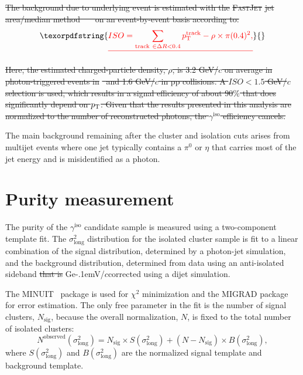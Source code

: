\documentclass[ALICE,manyauthors]{cernphprep}
\newcommand{\lambdasquare}{\ensuremath{\sigma^{2}_{\mathrm{long}}}}
\newcommand{\gammaiso}{\ensuremath{\gamma^\mathrm{iso}}}
\newcommand{\pPb}          {\mbox{p--Pb}\xspace}
\newcommand{\pt}           {\ensuremath{p_{\rm T}}\xspace}
\newcommand{\GeVc}         {Ge\kern-.1emV/$c$\xspace}
\providecommand{\DIFaddtex}[1]{{\protect\color{blue}\uwave{#1}}} %
\providecommand{\DIFdeltex}[1]{{\protect\color{red}\sout{#1}}}                      %
\providecommand{\DIFaddbegin}{} %
\providecommand{\DIFaddend}{} %
\providecommand{\DIFdelbegin}{} %
\providecommand{\DIFdelend}{} %
\providecommand{\DIFadd}[1]{\texorpdfstring{\DIFaddtex{#1}}{#1}} %
\providecommand{\DIFdel}[1]{\texorpdfstring{\DIFdeltex{#1}}{}} %
\newcommand{\DIFscaledelfig}{0.5}
\newlength{\DIFdelgraphicswidth} %
\newlength{\DIFdelgraphicsheight} %
\newcommand{\DIFaddincludegraphics}[2][]{{\color{blue}\fbox{\DIFOincludegraphics[#1]{#2}}}} %
\newcommand{\DIFdelincludegraphics}[2][]{%
\sbox{\DIFdelgraphicsbox}{\DIFOincludegraphics[#1]{#2}}%
\settoboxwidth{\DIFdelgraphicswidth}{\DIFdelgraphicsbox} %
\settoboxtotalheight{\DIFdelgraphicsheight}{\DIFdelgraphicsbox} %
\scalebox{\DIFscaledelfig}{%
\parbox[b]{\DIFdelgraphicswidth}{\usebox{\DIFdelgraphicsbox}\\[-\baselineskip] \rule{\DIFdelgraphicswidth}{0em}}\llap{\resizebox{\DIFdelgraphicswidth}{\DIFdelgraphicsheight}{%
\setlength{\unitlength}{\DIFdelgraphicswidth}%
\begin{picture}(1,1)%
\thicklines\linethickness{2pt} %
{\color[rgb]{1,0,0}\put(0,0){\framebox(1,1){}}}%
{\color[rgb]{1,0,0}\put(0,0){\line( 1,1){1}}}%
{\color[rgb]{1,0,0}\put(0,1){\line(1,-1){1}}}%
\end{picture}%
}\hspace*{3pt}}} %
} %
\DeclareRobustCommand{\DIFaddbegin}{\DIFOaddbegin \let\includegraphics\DIFaddincludegraphics} %
\DeclareRobustCommand{\DIFaddend}{\DIFOaddend \let\includegraphics\DIFOincludegraphics} %
\DeclareRobustCommand{\DIFdelbegin}{\DIFOdelbegin \let\includegraphics\DIFdelincludegraphics} %
\DeclareRobustCommand{\DIFdelend}{\DIFOaddend \let\includegraphics\DIFOincludegraphics} %
\begin{document}
\DIFdel{The background due to underlying event is estimated with the }\textsc{\DIFdel{FastJet}} %
\DIFdel{jet area/median method~\mbox{%
\cite{Cacciari:2009dp} }%
on an event-by-event basis according to:
}\begin{displaymath}
\DIFdel{ISO = \sum_{\mathrm{track}~\in\Delta R<0.4} p_{\mathrm{T}}^{\mathrm{track}} - \rho \times \pi(0.4)^{2},
}\end{displaymath}

\DIFdel{Here, the estimated charged-particle density, $\rho$, is 3.2 GeV/$c$ on average in photon-triggered events in }%
\DIFdel{~and 1.6 GeV/$c$ in pp collisions. A $ISO<1.5$ GeV/$c$ selection is used, which results in a signal efficiency of about 90$\%$ that does significantly depend on $\pt$. Given that the results presented in this analysis are normalized to the number of reconstructed photons, the $\gammaiso$ efficiency cancels. 
}%

\DIFdelend The main background 
remaining after the cluster and isolation cuts arises from multijet events where one jet typically contains a $\pi^{0}$ or $\eta$ that carries most of the jet energy and is misidentified as a photon.

\section{Purity measurement}
\label{sec:purity}
The purity of the $\gammaiso$ candidate sample is measured using a two-component template fit. The $\lambdasquare$ distribution for the isolated cluster sample is fit to a linear combination of the signal distribution, determined by a photon-jet simulation, and the background distribution, determined from data using an anti-isolated sideband \DIFdelbegin \DIFdel{that is }\DIFdelend \DIFaddbegin \DIFadd{($5.0 < ISO < 10.0$ }\GeVc\DIFadd{) and }\DIFaddend corrected using a dijet simulation.

The \textsc{MINUIT}~\cite{James:1975dr} package is used for $\chi^{2}$ minimization and the \textsc{MIGRAD} package for error estimation. The only free parameter in the fit is the number of signal clusters, $N_{\mathrm{sig}}$, because the overall normalization, $N$, is fixed to the total number of isolated clusters:
\begin{equation}
N^{\mathrm{observed}}(\lambdasquare) = N_{\mathrm{sig}}\times S(\lambdasquare) + (N-N_{\mathrm{sig}})\times B(\lambdasquare),
\end{equation}
where $S(\lambdasquare)$ and $B(\lambdasquare)$ are the normalized signal template and background template. 
\end{document}
